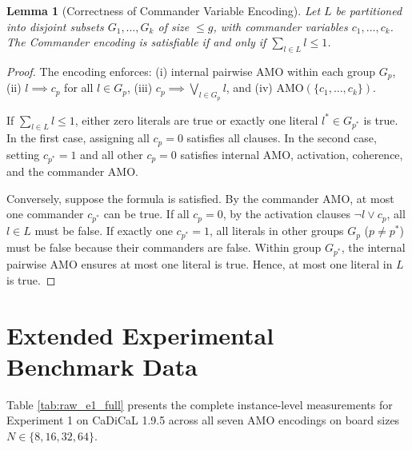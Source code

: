 \documentclass[a4paper,fleqn]{cas-sc}
\newtheorem{lemma}{Lemma}
\begin{document}
\begin{lemma}[Correctness of Commander Variable Encoding]
Let $L$ be partitioned into disjoint subsets $G_1, \dots, G_k$ of size $\le g$, with commander variables $c_1, \dots, c_k$. The Commander encoding is satisfiable if and only if $\sum_{l \in L} l \le 1$.
\end{lemma}
\begin{proof}
The encoding enforces: (i) internal pairwise AMO within each group $G_p$, (ii) $l \implies c_p$ for all $l \in G_p$, (iii) $c_p \implies \bigvee_{l \in G_p} l$, and (iv) $\text{AMO}(\{c_1, \dots, c_k\})$. 

If $\sum_{l \in L} l \le 1$, either zero literals are true or exactly one literal $l^* \in G_{p^*}$ is true. In the first case, assigning all $c_p = 0$ satisfies all clauses. In the second case, setting $c_{p^*} = 1$ and all other $c_p = 0$ satisfies internal AMO, activation, coherence, and the commander AMO. 

Conversely, suppose the formula is satisfied. By the commander AMO, at most one commander $c_{p^*}$ can be true. If all $c_p = 0$, by the activation clauses $\neg l \lor c_p$, all $l \in L$ must be false. If exactly one $c_{p^*} = 1$, all literals in other groups $G_p$ ($p \ne p^*$) must be false because their commanders are false. Within group $G_{p^*}$, the internal pairwise AMO ensures at most one literal is true. Hence, at most one literal in $L$ is true.
\end{proof}

\section{Extended Experimental Benchmark Data}
\label{sec:appendix_tables}

Table \ref{tab:raw_e1_full} presents the complete instance-level measurements for Experiment 1 on CaDiCaL 1.9.5 across all seven AMO encodings on board sizes $N \in \{8, 16, 32, 64\}$.
\end{document}
